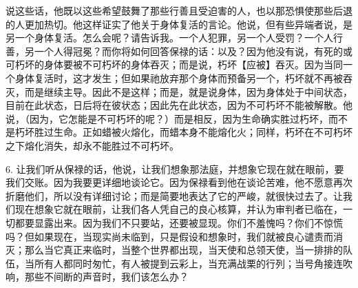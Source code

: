 说这些话，他既以这些希望鼓舞了那些行善且受迫害的人，也以那恐惧使那些后退的人更加热切。他这样证实了他关于身体复活的言论。他说，但有些异端者说，是另一个身体复活。怎么会呢？请告诉我。一个人犯罪，另一个人受罚？一个人行善，另一个人得冠冕？而你将如何回答保禄的话：以及？因为他没有说，有死的或可朽坏的身体要被不可朽坏的身体吞灭；而是说，朽坏【应被】吞灭。因为当同一个身体复活时，这才发生；但如果祂放弃那个身体而预备另一个，朽坏就不再被吞灭，而是继续主导。因此不是这样；而是，就是说身体，因为身体处于中间状态，目前在此状态，日后将在彼状态；因此先在此状态，因为不可朽坏不能被解散。他说，（因为，它怎能是不可朽坏的呢？）而是相反，因为生命确实胜过朽坏，而不是朽坏胜过生命。正如蜡被火熔化，而蜡本身不能熔化火；同样，朽坏在不可朽坏之下熔化消失，却永不能胜过不可朽坏。\par

6. 让我们听从保禄的话，他说，让我们想象那法庭，并想象它现在就在眼前，要我们交账。因为我要更详细地谈论它。因为保禄看到他在谈论苦难，他不愿意再次折磨他们，所以没有详细讨论；而是简要地表达了它的严峻，就很快过去了。让我们现在想象它就在眼前，让我们各人凭自己的良心核算，并认为审判者已临在，一切都要显露出来。因为我们不只要站，还要被显现。你们不羞愧吗？你们不惊慌吗？但如果现在，当现实尚未临到，只是假设和想象时，我们就被良心谴责而消灭；那么当它真正来临时，当整个世界都出现，当天使和总领天使，当一排排的队伍，当所有人都同时匆忙，有人被提到云彩上，当充满战栗的行列；当号角接连吹响，那些不间断的声音时，我们该怎么办？\par

